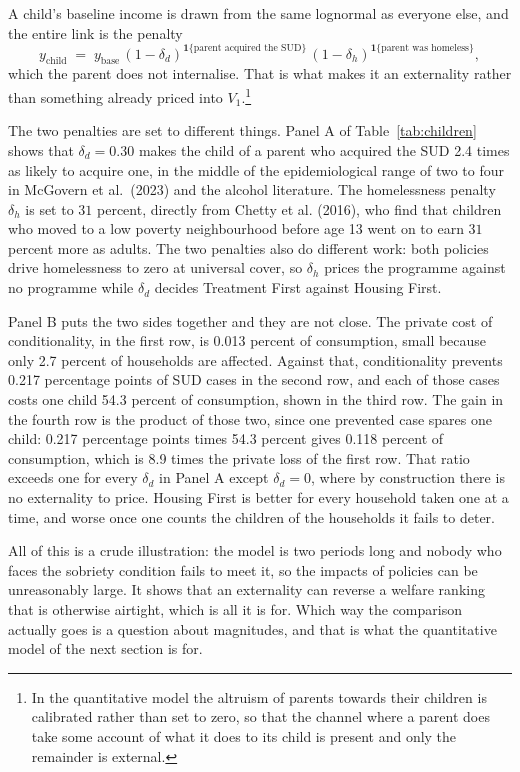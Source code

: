 \documentclass[10pt]{article}
\begin{document}
A child's baseline income is drawn from the same lognormal as everyone else, and
the entire link is the penalty
\begin{equation}\label{eq:kids}
y_{\text{child}} \;=\; y_{\text{base}}\,
(1-\delta_d)^{\mathbf{1}\{\text{parent acquired the SUD}\}}\,
(1-\delta_h)^{\mathbf{1}\{\text{parent was homeless}\}} ,
\end{equation}
which the parent does not internalise. That is what makes it an externality
rather than something already priced into $V_1$.\footnote{In the quantitative
model the altruism of parents towards their children is calibrated rather than
set to zero, so that the channel where a parent does take some account of what it
does to its child is present and only the remainder is external.}

The two penalties are set to different things. Panel A of
Table~\ref{tab:children} shows that $\delta_d = 0.30$ makes the child of a
parent who acquired the SUD 2.4 times as likely to acquire one, in
the middle of the epidemiological range of two to four in McGovern et al.\
(2023) and the alcohol literature. The homelessness penalty $\delta_h$ is set
to $31$ percent, directly from Chetty et al. (2016), who find
that children who moved to a low poverty neighbourhood before age 13 went on to
earn $31$ percent more as adults. The two penalties also do different work: both policies drive
homelessness to zero at universal cover, so $\delta_h$ prices the programme
against no programme while $\delta_d$ decides Treatment First against Housing
First.


Panel B puts the two sides together and they are not close. The private cost of
conditionality, in the first row, is 0.013 percent of consumption, small
because only 2.7 percent of households are affected. Against that,
conditionality prevents 0.217 percentage points of SUD cases in the
second row, and each of those cases costs one child 54.3 percent of
consumption, shown in the third row. The gain in the fourth row is the
product of those two, since one prevented case spares one child: 0.217
percentage points times 54.3 percent gives 0.118 percent of
consumption, which is 8.9 times the private loss of the first row.
That ratio exceeds one for every $\delta_d$ in Panel A except $\delta_d=0$, where
by construction there is no externality to price. Housing
First is better for every household taken one at a time, and worse once one
counts the children of the households it fails to deter.

All of this is a crude illustration: the model is two periods long and
nobody who faces the sobriety condition fails to meet it, so the impacts of
policies can be unreasonably large. It shows that an
externality can reverse a welfare ranking that is
otherwise airtight, which is all it is for. Which way the comparison actually
goes is a question about magnitudes, and that is what the quantitative model of
the next section is for.
\end{document}
